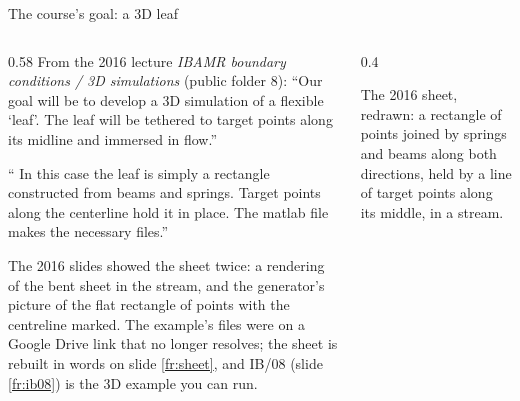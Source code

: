 \documentclass[aspectratio=169,11pt]{beamer}
\begin{document}
\begin{frame}{The course's goal: a 3D leaf}
\label{fr:leaf}
\begin{columns}[T,onlytextwidth]
\begin{column}{0.58\textwidth}
\small From the 2016 lecture \emph{IBAMR boundary conditions / 3D simulations} (public folder 8): ``Our goal will be to develop a 3D simulation of a flexible `leaf'. The leaf will be tethered to target points along its midline and immersed in flow.''
\vspace{1mm}

\small `` In this case the leaf is simply a rectangle constructed from beams and springs. Target points along the centerline hold it in place. The matlab file  makes the necessary files.''
\vspace{1mm}

\footnotesize The 2016 slides showed the sheet twice: a rendering of the bent sheet in the stream, and the generator's picture of the flat rectangle of points with the centreline marked. The example's files were on a Google Drive link that no longer resolves; the sheet is rebuilt in words on slide \ref{fr:sheet}, and IB/08 (slide \ref{fr:ib08}) is the 3D example you can run.
\end{column}
\begin{column}{0.4\textwidth}
\centering
{}

\scriptsize The 2016 sheet, redrawn: a rectangle of points joined by springs and beams along both directions, held by a line of target points along its middle, in a stream.
\end{column}
\end{columns}
\end{frame}
\end{document}
